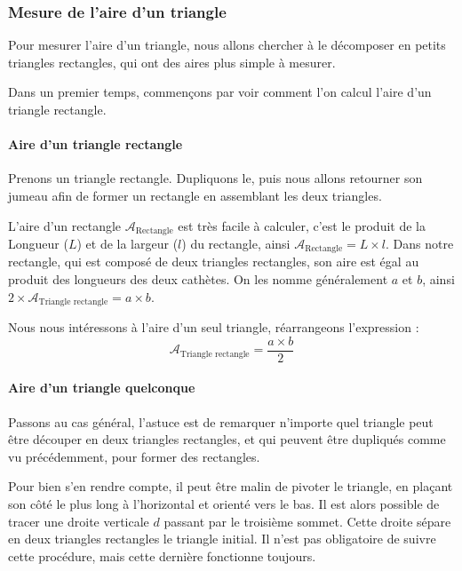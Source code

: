\documentclass[a4paper, twoside]{article}
\begin{document}
\newpage

\subsubsection{Mesure de l'aire d'un triangle}

Pour mesurer l'aire d'un triangle, nous allons chercher à le décomposer
en petits triangles rectangles, qui ont des aires plus simple à mesurer.

Dans un premier temps, commençons par voir comment l'on
calcul l'aire d'un triangle rectangle.

\paragraph*{Aire d'un triangle rectangle}

Prenons un triangle rectangle.
Dupliquons le, puis nous allons retourner
son jumeau afin de former un rectangle en assemblant les deux triangles.

L'aire d'un rectangle $\mathcal{A}_{\text{Rectangle}}$ est très facile à calculer,
c'est le produit de la Longueur ($L$) et de la largeur ($l$) du rectangle,
ainsi $\mathcal{A}_{\text{Rectangle}} = L \times l$.
Dans notre rectangle, qui est composé de deux triangles rectangles,
son aire est égal au produit des longueurs des deux cathètes.
On les nomme généralement $a$ et $b$, ainsi $2 \times \mathcal{A}_{\text{Triangle rectangle}} = a \times b$.

Nous nous intéressons à l'aire d'un seul triangle,
réarrangeons l'expression : $$ \mathcal{A}_{\text{Triangle rectangle}} = \frac{a \times b}{2} $$

\paragraph*{Aire d'un triangle quelconque}

Passons au cas général, l'astuce est de remarquer n'importe quel triangle
peut être découper en deux triangles rectangles,
et qui peuvent être dupliqués comme vu précédemment, pour former des rectangles.

Pour bien s'en rendre compte,
il peut être malin de pivoter le triangle,
en plaçant son côté le plus long à l'horizontal et orienté vers le bas.
Il est alors possible de tracer une droite verticale $d$ passant par le troisième sommet.
Cette droite sépare en deux triangles rectangles le triangle initial.
Il n'est pas obligatoire de suivre cette procédure,
mais cette dernière fonctionne toujours.
\end{document}
